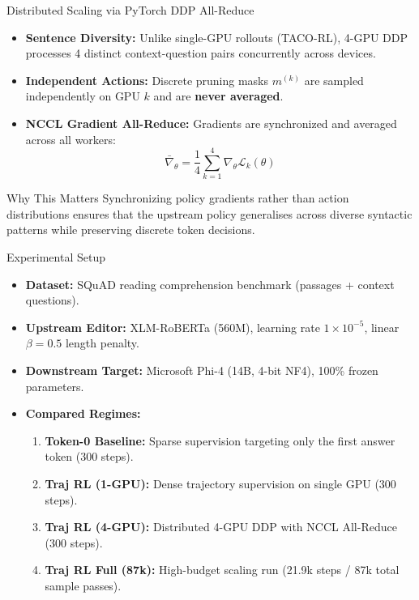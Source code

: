 \documentclass[aspectratio=169,10pt]{beamer}
\begin{document}
\begin{frame}{Distributed Scaling via PyTorch DDP All-Reduce}
  \begin{itemize}
    \item \textbf{Sentence Diversity:} Unlike single-GPU rollouts (TACO-RL), 4-GPU DDP processes 4 distinct context-question pairs concurrently across devices.
    \item \textbf{Independent Actions:} Discrete pruning masks $m^{(k)}$ are sampled independently on GPU $k$ and are \textbf{never averaged}.
    \item \textbf{NCCL Gradient All-Reduce:} Gradients are synchronized and averaged across all workers:
    $$\bar{\nabla}_\theta = \frac{1}{4} \sum_{k=1}^4 \nabla_\theta \mathcal{L}_k(\theta)$$
  \end{itemize}
  \begin{block}{Why This Matters}
    Synchronizing policy gradients rather than action distributions ensures that the upstream policy generalises across diverse syntactic patterns while preserving discrete token decisions.
  \end{block}
\end{frame}

\begin{frame}{Experimental Setup}
  \begin{itemize}
    \item \textbf{Dataset:} SQuAD reading comprehension benchmark (passages + context questions).
    \item \textbf{Upstream Editor:} XLM-RoBERTa (560M), learning rate $1\times 10^{-5}$, linear $\beta=0.5$ length penalty.
    \item \textbf{Downstream Target:} Microsoft Phi-4 (14B, 4-bit NF4), 100\% frozen parameters.
    \item \textbf{Compared Regimes:}
      \begin{enumerate}
        \item \textbf{Token-0 Baseline:} Sparse supervision targeting only the first answer token (300 steps).
        \item \textbf{Traj RL (1-GPU):} Dense trajectory supervision on single GPU (300 steps).
        \item \textbf{Traj RL (4-GPU):} Distributed 4-GPU DDP with NCCL All-Reduce (300 steps).
        \item \textbf{Traj RL Full (87k):} High-budget scaling run (21.9k steps / 87k total sample passes).
      \end{enumerate}
  \end{itemize}
\end{frame}
\end{document}
